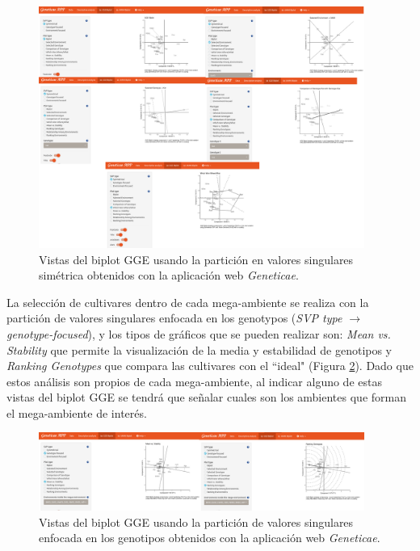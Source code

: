 \begin{figure}[H]
	\begin{center}
		\includegraphics[width=0.95\textwidth]{./Graficos/www/GGE_biplotAPP1.png}
	\end{center}
	\caption{Vistas del biplot GGE usando la partición en valores singulares simétrica obtenidos con la aplicación web \emph{Geneticae}.}
	\label{fig:ggebip1}
\end{figure}

La selección de cultivares dentro de cada mega-ambiente se realiza con la partición de valores singulares enfocada en los genotypos (\emph{SVP type $\rightarrow$ genotype-focused}), y los tipos de gráficos que se pueden realizar son: \emph{Mean vs. Stability} que permite la visualización de la media y estabilidad de genotipos y \emph{Ranking Genotypes} que compara las cultivares con el ``ideal" (Figura \ref{fig:ggebip2}). Dado que estos análisis son propios de cada mega-ambiente, al indicar alguno de estas vistas del biplot GGE se tendrá que señalar cuales son los ambientes que forman el mega-ambiente de interés. 


\begin{figure}[H]
	\begin{center}
		\includegraphics[width=0.95\textwidth]{./Graficos/www/GGE_biplotAPP2.png}
	\end{center}
	\caption{Vistas del biplot GGE usando la partición de valores singulares enfocada en los genotipos obtenidos con la aplicación web \emph{Geneticae}.}
	\label{fig:ggebip2}
\end{figure}

